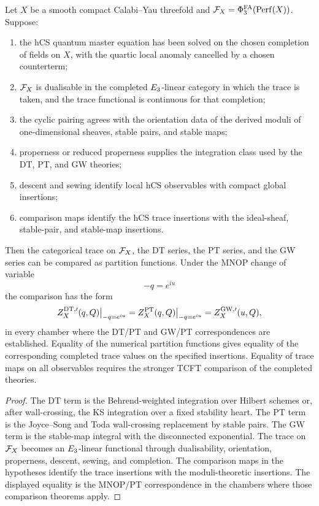 \begin{theorem}
\label{wn:thm:e3-trace-conditional}
Let \(X\) be a smooth compact Calabi--Yau threefold and
\(\mathcal{F}_X=\Phi^{\mathrm{FA}}_3(\mathrm{Perf}(X))\).  Suppose:
\begin{enumerate}
\item the hCS quantum master equation has been solved on the chosen
completion of fields on \(X\), with the quartic local anomaly
cancelled by a chosen counterterm;
\item \(\mathcal{F}_X\) is dualisable in the completed \(E_3\)-linear
category in which the trace is taken, and the trace functional is
continuous for that completion;
\item the cyclic pairing agrees with the orientation data of the
derived moduli of one-dimensional sheaves, stable pairs, and stable
maps;
\item properness or reduced properness supplies the integration class
used by the DT, PT, and GW theories;
\item descent and sewing identify local hCS observables with compact
global insertions;
\item comparison maps identify the hCS trace insertions with the
ideal-sheaf, stable-pair, and stable-map insertions.
\end{enumerate}
Then the categorical trace on \(\mathcal{F}_X\), the DT series, the PT series,
and the GW series can be compared as partition functions.  Under the
MNOP change of variable
\[
  -q=e^{iu}
\]
the comparison has the form
\[
  Z^{\mathrm{DT},\prime}_X(q,Q)\big|_{-q=e^{iu}}
  =
  Z^{\mathrm{PT}}_X(q,Q)\big|_{-q=e^{iu}}
  =
  Z^{\mathrm{GW},\prime}_X(u,Q),
\]
in every chamber where the DT/PT and GW/PT correspondences are
established.  Equality of the numerical partition functions gives
equality of the corresponding completed trace values on the specified
insertions.  Equality of trace maps on all observables requires the
stronger TCFT comparison of the completed theories.
\end{theorem}

\begin{proof}
The DT term is the Behrend-weighted integration over Hilbert schemes
or, after wall-crossing, the KS integration over a fixed stability
heart.  The PT term is the Joyce--Song and Toda wall-crossing
replacement by stable pairs.  The GW term is the stable-map integral
with the disconnected exponential.  The trace on \(\mathcal{F}_X\) becomes an
\(E_3\)-linear functional through dualisability, orientation,
properness, descent, sewing, and completion.  The comparison maps in
the hypotheses identify the trace insertions with the
moduli-theoretic insertions.  The displayed equality is the MNOP/PT
correspondence in the chambers where those comparison theorems apply.
\end{proof}

